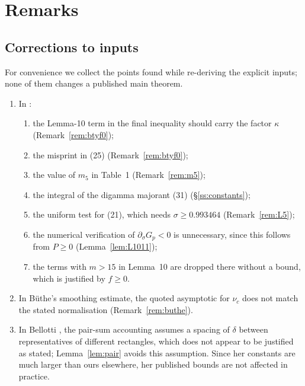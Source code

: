 \section{Remarks}\label{sec:remarks}

\subsection{Corrections to inputs}
For convenience we collect the points found while re-deriving the explicit inputs; none of them changes a published main theorem.
\begin{enumerate}
\item In \cite{BTY}:
  \begin{enumerate}
  \item the Lemma-10 term in the final inequality should carry the factor $\kappa$ (Remark~\ref{rem:btyf0});
  \item the misprint in (25) (Remark~\ref{rem:btyf0});
  \item the value of $m_5$ in Table~1 (Remark~\ref{rem:m5});
  \item the integral of the digamma majorant (31) (\S\ref{ss:constants});
  \item the uniform test for (21), which needs $\sigma \ge 0.993464$ (Remark~\ref{rem:L5});
  \item the numerical verification of $\partial_\sigma G_p < 0$ is unnecessary, since this follows from $P \ge 0$ (Lemma~\ref{lem:L1011});
  \item the terms with $m > 15$ in Lemma~10 are dropped there without a bound, which is justified by $f\ge0$.
  \end{enumerate}
\item In B\"uthe's smoothing estimate, the quoted asymptotic for $\nu_c$ does not match the stated normalisation (Remark~\ref{rem:buthe}).
\item In Bellotti \cite{Bellotti}, the pair-sum accounting \cite[(4.11)]{Bellotti} assumes a spacing of $\delta$ between representatives of different rectangles, which does not appear to be justified as stated; Lemma~\ref{lem:pair} avoids this assumption.
  Since her constants are much larger than ours elsewhere, her published bounds are not affected in practice.
\end{enumerate}

